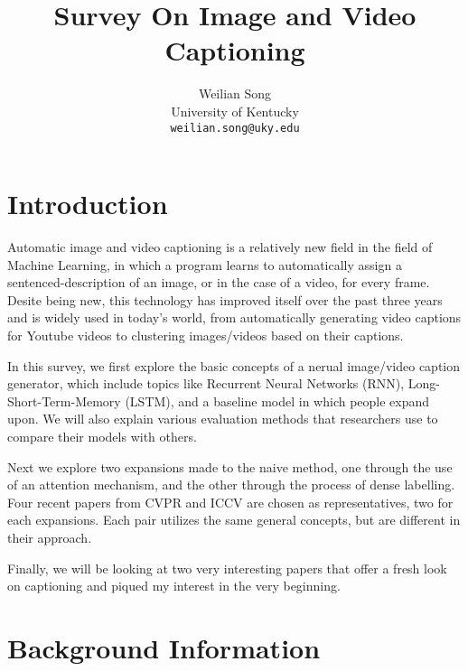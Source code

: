 \documentclass[10pt,twocolumn,letterpaper]{article}
\begin{document}
\title{Survey On Image and Video Captioning}

\author{Weilian Song\\
University of Kentucky\\
{\tt\small weilian.song@uky.edu}
}

\maketitle

\section{Introduction}

Automatic image and video captioning is a relatively new field in the field of
Machine Learning, in which a program learns to automatically assign a
sentenced-description of an image, or in the case of a video, for every frame.
Desite being new, this technology has improved itself over the past three
years and is widely used in today's world, from automatically generating video
captions for Youtube videos to clustering images/videos based on their
captions.

In this survey, we first explore the basic concepts of a nerual image/video
caption generator, which include topics like Recurrent Neural Networks (RNN),
Long-Short-Term-Memory (LSTM), and a baseline model in which people expand
upon. We will also explain various evaluation methods that researchers use to
compare their models with others.

Next we explore two expansions made to the naive method, one through the use
of an attention mechanism, and the other through the process of dense
labelling. Four recent papers from CVPR and ICCV are chosen as
representatives, two for each expansions. Each pair utilizes the same general
concepts, but are different in their approach.

Finally, we will be looking at two very interesting papers that offer a fresh
look on captioning and piqued my interest in the very beginning.

\section{Background Information}
\end{document}
